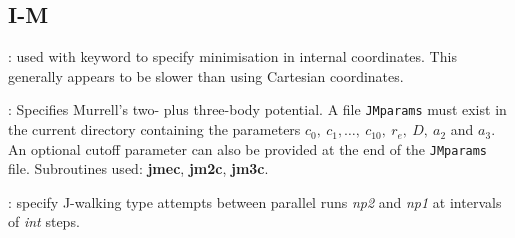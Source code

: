 

\subsection{I-M}
: used with {} keyword to specify minimisation in internal 
coordinates. This generally appears to be
slower than using Cartesian coordinates.

: Specifies Murrell's two- plus three-body
potential.\cite{murrellm90,murrellr90,alderzijmr91,eggenjlm92,fengjm93}
A file {\tt JMparams} must
exist in the current directory containing the parameters $c_0,\ c_1,\ldots,\ c_{10},\ r_e,\
D,\ a_2$ and $a_3$. An optional cutoff parameter can also be provided at the end of the
{\tt JMparams} file.
Subroutines used: {\bf jmec}, {\bf jm2c}, {\bf jm3c}.

: specify J-walking type attempts between parallel runs {\it np2\/}
and {\it np1\/} at intervals of {\it int\/} steps.


